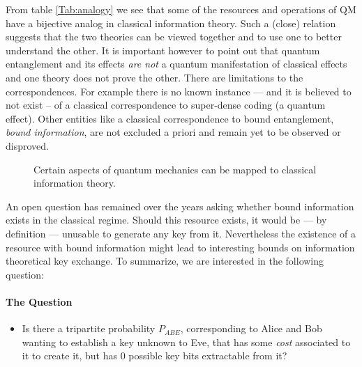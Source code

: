 
From table \ref{Tab:analogy} we see that some of the resources and operations of QM have a bijective analog in classical information theory. 
Such a (close) relation suggests that the two theories can be viewed together and to use one to better understand the other. 
It is important however to point out that quantum entanglement and its effects \emph{are not} a quantum manifestation of classical effects and one theory does not prove the other.
There are limitations to the correspondences. 
For example there is no known instance --- and it is believed to not exist -- of a classical correspondence to super-dense coding (a quantum effect). Other entities like a classical correspondence to bound entanglement, \emph{bound information}, are not excluded a priori and remain yet to be observed or disproved.

	\begin{figure}[h!]
		\centering
		
		\caption{Certain aspects of quantum mechanics can be mapped to classical information theory.}
		\label{Fig:bigpicture}
	\end{figure}
An open question has remained over the years asking whether bound information exists in the classical regime.
Should this resource exists, it would be --- by definition --- unusable to generate any key from it.
Nevertheless the existence of a resource with bound information might lead to interesting bounds on information theoretical key exchange.
To summarize, we are interested in the following question:

\paragraph*{The Question}
\begin{itemize}
		\item[] Is there a tripartite probability $P_{ABE}$, corresponding to Alice and Bob wanting to establish a key unknown to Eve, that has some \emph{cost} associated to it to create it, but has $0$ possible key bits extractable from it? 
\end{itemize}


	